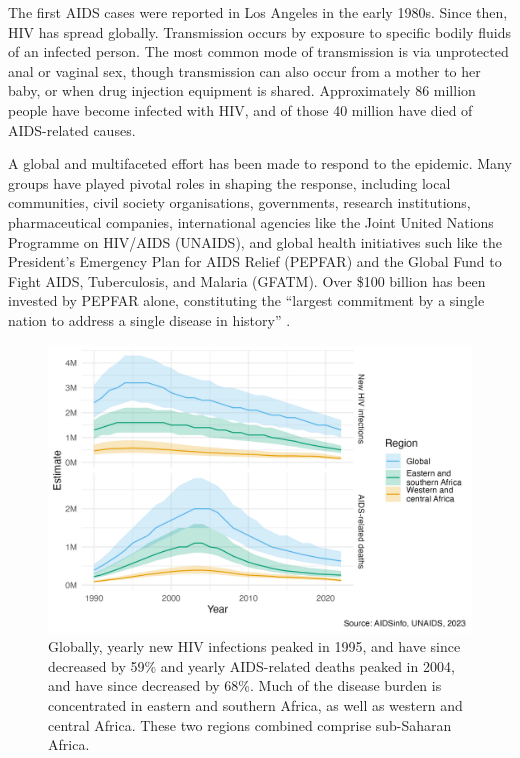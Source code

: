 \documentclass[a4paper, nobind]{templates/ociamthesis}
\begin{document}
The first AIDS cases were reported in Los Angeles in the early 1980s.
Since then, HIV has spread globally.
Transmission occurs by exposure to specific bodily fluids of an infected person.
The most common mode of transmission is via unprotected anal or vaginal sex, though transmission can also occur from a mother to her baby, or when drug injection equipment is shared.
Approximately 86 million people have become infected with HIV, and of those 40 million have died of AIDS-related causes.

A global and multifaceted effort has been made to respond to the epidemic.
Many groups have played pivotal roles in shaping the response, including local communities, civil society organisations, governments, research institutions, pharmaceutical companies, international agencies like the Joint United Nations Programme on HIV/AIDS (UNAIDS), and global health initiatives such like the President's Emergency Plan for AIDS Relief (PEPFAR) and the Global Fund to Fight AIDS, Tuberculosis, and Malaria (GFATM).
Over \$100 billion has been invested by PEPFAR alone, constituting the ``largest commitment by a single nation to address a single disease in history'' \autocite{pepfar2022}.

\begin{figure}

{\centering \includegraphics[width=0.95\linewidth]{figures/hiv-aids/overall-picture} 

}

\caption{Globally, yearly new HIV infections peaked in 1995, and have since decreased by 59\% and yearly AIDS-related deaths peaked in 2004, and have since decreased by 68\%. Much of the disease burden is concentrated in eastern and southern Africa, as well as western and central Africa. These two regions combined comprise sub-Saharan Africa.}\label{fig:overall-picture}
\end{figure}
\end{document}
